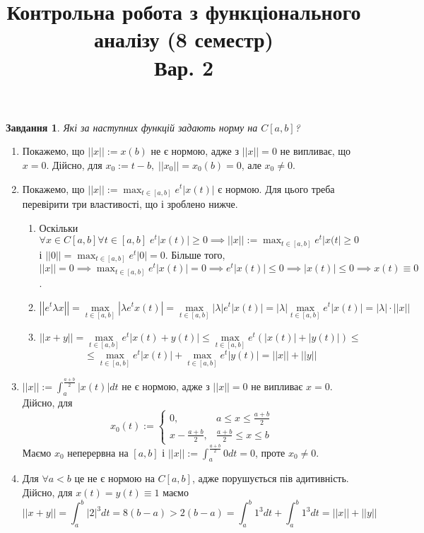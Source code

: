 \documentclass[12pt]{article} %
\title{Контрольна робота з функціонального аналізу (8 семестр)\\Вар. 2}
\newcommand{\mynorm}[1]{\left|\left|#1\right|\right|}
\newcommand{\myabs}[1]{\left|#1\right|}
\let\oldmax\max
\renewcommand{\max}{\displaystyle\oldmax}
\newtheorem{prob}{Завдання}
\begin{document}
\maketitle
\begin{prob}Які за наступних функцій задають норму на $C[a,b]$?\end{prob}
	\begin{enumerate}
		\item{Покажемо, що $\mynorm{x}:=x(b)$ не є нормою, адже з $\mynorm{x}=0$ не випливає, що $x= 0$. Дійсно, для $
			x_0:=t-b,\;\mynorm{x_0}=x_0(b)=0$, але $x_0\neq 0$.
			}
		\item{Покажемо, що $\mynorm{x}:=\max_{t\in [a,b]}e^t\myabs{x(t)}$ є нормою. Для цього треба перевірити три властивості, 
			що і зроблено нижче.
			\begin{enumerate}[label=(\arabic*)]
				\item{Оскільки $\forall x\in C[a,b]\forall t\in[a,b]\;e^t\myabs{x(t)}\geq0\implies
					\mynorm{x}:=\max_{t\in [a,b]}e^t\myabs{x(t}\geq 0$ і $\mynorm{0}=\max_{t\in [a,b]}e^t\myabs{0}=0$.
					Більше того, $\mynorm{x}=0\implies\max_{t\in [a,b]}e^t\myabs{x(t)}=0\implies e^t\myabs{x(t)}\leq 0\implies
					\myabs{x(t)}\leq 0\implies
					x(t)\equiv 0$.
					}
				\item{
					\newcommand{\mymax}{\max_{t\in[a,b]}e^t}
					\[\mynorm{e^t\lambda x}=\max_{t\in [a,b]}\myabs{\lambda e^t
					x(t)}=\max_{t\in[a,b]}\myabs{\lambda}e^t\myabs{x(t)}=
					\myabs{\lambda}\mymax \myabs{x(t)}=
					\myabs{\lambda}\cdot\mynorm{x}\]}
				\item{
					\newcommand{\mymax}{\max_{t\in[a,b]}e^t}
					\[\mynorm{x+y}=\mymax\myabs{x(t)+y(t)}\leq\mymax(\myabs{x(t)}+\myabs{y(t)})\leq\]
					\[\leq\mymax\myabs{x(t)}+\mymax\myabs{y(t)}=\mynorm{x}+\mynorm{y}\]
					}
			\end{enumerate}
		}
	\item{$\mynorm{x}:=\int_a^{\frac{a+b}{2}}\myabs{x(t)}dt$ не є нормою, адже з $\mynorm{x}=0$ не випливає $x=0$. Дійсно, для 
		\[x_0(t):=\begin{cases}
			0, &a\leq x\leq \frac{a+b}{2}\\
			x-\frac{a+b}{2}, &\frac{a+b}{2}\leq x\leq b
		\end{cases}
		\]
		Маємо $x_0$ неперервна на $[a,b]$ і $\mynorm{x}:=\int_a^{\frac{a+b}{2}}0dt=0$, проте $x_0\neq 0$.
		}
	\item{Для $\forall a<b$ це не є нормою на $C[a,b]$, адже порушується пів адитивність. Дійсно, для $x(t)=y(t)\equiv 1$ маємо
		\[\mynorm{x+y}=\int_a^b \myabs{2}^3dt=8(b-a)>2(b-a)=\int_a^b 1^3dt+\int_a^b 1^3dt=\mynorm{x}+\mynorm{y}\]
}
\end{enumerate}
\end{document}
